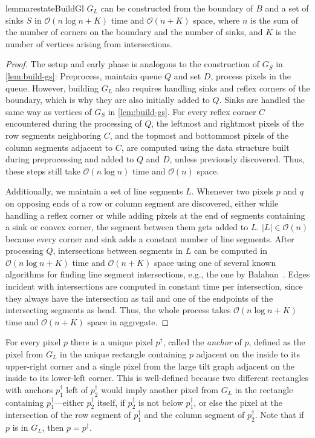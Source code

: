 \documentclass[a4paper,UKenglish,cleveref,thm-restate]{lipics-v2021}
\newcommand{\BigO}{\mathcal{O}}
\begin{document}
\begin{restatable}{lemma}{restateBuildGl}\label{lem:build-gl}
$G_L$ can be constructed from the boundary of $B$ and a set of sinks $S$ in
$\BigO(n \log n + K)$ time and $\BigO(n+K)$ space, where $n$ is the sum of the number
of corners on the boundary and the number of sinks, and $K$ is the
number of vertices arising from intersections.
\end{restatable}
\begin{proof}
    The setup and early phase is analogous to the construction of $G_S$ in
    \cref{lem:build-gs}: Preprocess, maintain queue $Q$ and set $D$, process pixels in
    the queue. However, building $G_L$ also requires handling sinks and reflex
    corners of the boundary, which is why they are also initially added to
    $Q$. Sinks are handled the same way as vertices of $G_S$ in \cref{lem:build-gs}.
    For every reflex corner $C$ encountered during the processing of $Q$, the
    leftmost and rightmost pixels of the row segments neighboring $C$, and the
    topmost and bottommost pixels of the column segments adjacent to $C$, are
    computed using the data structure built during preprocessing and added to $Q$
    and $D$, unless previously discovered. Thus, these steps still take $\BigO(n \log
    n)$ time and $\BigO(n)$ space.

    Additionally, we maintain a set of line segments $L$. Whenever two pixels $p$
    and $q$ on opposing ends of a row or column segment are discovered, either while
    handling a reflex corner or while adding pixels at the end of segments
    containing a sink or convex corner, the segment between them gets added to
    $L$. $\vert L \vert \in \BigO(n)$ because every corner and sink adds a constant number of
    line segments. After processing $Q$, intersections between segments in $L$ can
    be computed in $\BigO(n \log n + K)$ time and $\BigO(n+K)$ space using one of several
    known algorithms for finding line segment intersections, e.g., the one by
    Balaban~\cite{balaban-intersections1995}. Edges incident with intersections are
    computed in constant time per intersection, since they always have the
    intersection as tail and one of the endpoints of the intersecting segments as
    head. Thus, the whole process takes $\BigO(n \log n + K)$ time and $\BigO(n+K)$ space
    in aggregate.
\end{proof}

For every pixel $p$ there is a unique pixel $p^\dagger$, called the
\emph{anchor} of $p$, defined as the pixel from $G_L$ in the unique rectangle
containing $p$ adjacent on the inside to its upper-right corner and a single
pixel from the large tilt graph adjacent on the inside to its lower-left corner.
This is well-defined because two different rectangles with anchors $p_1^\dagger$
left of $p_2^\dagger$ would imply another pixel from $G_L$ in the rectangle
containing $p_1^\dagger$---either $p_2^\dagger$ itself, if $p_2^\dagger$ is not
below $p_1^\dagger$, or else the pixel at the intersection of the row segment of
$p_1^\dagger$ and the column segment of $p_2^\dagger$. Note that if $p$ is
in $G_L$, then $p=p^\dagger$.
\end{document}

